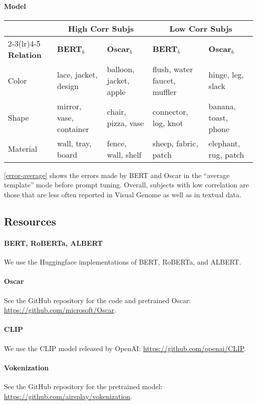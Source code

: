 \documentclass[11pt]{article}
\begin{document}
\paragraph{Model}

\begin{table*}[ht]
\small
\centering
\begin{tabular}{l|ll|ll}
\hline
& \multicolumn{2}{c|}{\textbf{High Corr Subjs}} & \multicolumn{2}{c}{\textbf{Low Corr Subjs}}\\
\cmidrule(lr){2-3}\cmidrule(lr){4-5}
\textbf{Relation} & \textbf{BERT$_b$} & \textbf{Oscar$_b$} & \textbf{BERT$_b$} & \textbf{Oscar$_b$}\\
\hline
Color & lace, jacket, design & balloon, jacket, apple & flush, water faucet, muffler & hinge, leg, slack\\
Shape & mirror, vase, container & chair, pizza, vase & connector, log, knot & banana, toast, phone\\
Material & wall, tray, board & fence, wall, shelf & sheep, fabric, patch & elephant, rug, patch\\
\hline
\end{tabular}
\caption{\label{error-average}
Three subjects each with high and low correlations for relations color, shape, and material.}
\end{table*}

\cref{error-average} shows the errors made by BERT and Oscar in the ``average template'' mode before prompt tuning. Overall, subjects with low correlation are those that are less often reported in Visual Genome as well as in textual data.


\subsection{Resources}
\label{resources}

\paragraph{BERT, RoBERTa, ALBERT}
We use the Huggingface implementations of BERT, RoBERTa, and ALBERT.

\paragraph{Oscar}
See the GitHub repository for the code and pretrained Oscar: \url{https://github.com/microsoft/Oscar}.

\paragraph{CLIP}
We use the CLIP model released by OpenAI: \url{https://github.com/openai/CLIP}.

\paragraph{Vokenization}
See the GitHub repository for the pretrained model: \url{https://github.com/airsplay/vokenization}.
\end{document}

